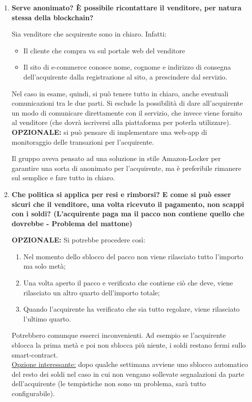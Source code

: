 \documentclass[11pt]{article}
\begin{document}
\begin{enumerate}
				\bigskip				
				
				\item \textbf{Serve anonimato? È possibile ricontattare il venditore, per natura stessa della blockchain?}
				
				\medskip
				
				Sia venditore che acquirente sono in chiaro. Infatti:
				\begin{itemize}
					\item Il cliente che compra va sul portale web del venditore 
					\item Il sito di e-commerce conosce nome, cognome e indirizzo di consegna dell'acquirente dalla
					registrazione al sito, a prescindere dal servizio.
				\end{itemize}
				
				Nel caso in esame, quindi, si può tenere tutto in chiaro, anche eventuali comunicazioni tra le due parti. Si esclude
				la possibilità di dare all'acquirente un modo di comunicare direttamente con il servizio, che invece
				viene fornito al venditore (che dovrà iscriversi alla piattaforma per poterla utilizzare). \\
				\textbf{OPZIONALE:} si può pensare di implementare una web-app di monitoraggio delle transazioni
				per l'acquirente.
				
				Il gruppo aveva pensato ad una soluzione in stile Amazon-Locker per garantire una sorta di anonimato per
				l'acquirente, ma è preferibile rimanere sul semplice e fare tutto in chiaro.
				
				\bigskip
				
				\item \textbf{Che politica si applica per resi e rimborsi? E come si può esser sicuri che il venditore, una volta
				ricevuto il pagamento, non scappi con i soldi? (L'acquirente paga ma il pacco non contiene quello che dovrebbe -
				Problema del mattone)}
				
				\medskip
				
				\textbf{OPZIONALE:} Si potrebbe procedere così:
					\begin{enumerate}
						\item Nel momento dello sblocco del pacco non viene rilasciato tutto l'importo ma solo metà;
						\item Una volta aperto il pacco e verificato che contiene ciò che deve, viene rilasciato un altro
						quarto dell'importo totale;
						\item Quando l'acquirente ha verificato che sia tutto regolare, viene rilasciato l'ultimo quarto.
					\end{enumerate}   
				Potrebbero comunque esserci inconvenienti. Ad esempio se l'acquirente sblocca la prima metà e poi non sblocca
				più niente, i soldi restano fermi sullo smart-contract. \\
				\underline{Opzione interessante:} dopo qualche settimana avviene uno sblocco automatico del resto dei soldi
				nel caso in cui non vengano sollevate segnalazioni da parte dell'acquirente (le tempistiche non sono un
				problema, sarà tutto configurabile).
				

\end{enumerate}
\end{document}
